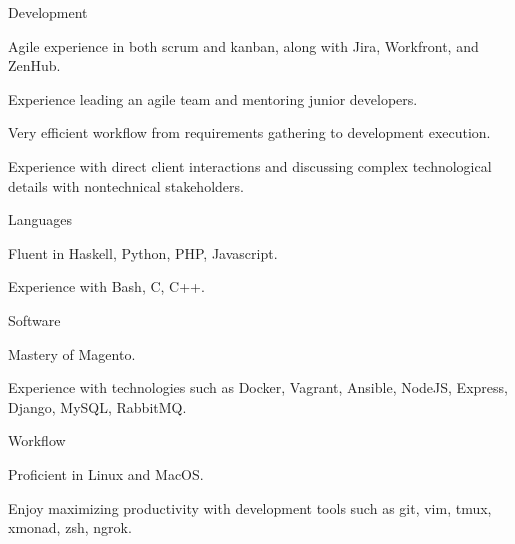 \begin{cvskills}
  \cvskill
    {Development}
    {\begin{cvitems}
        \item Agile experience in both scrum and kanban, along with Jira, Workfront, and ZenHub.
        \item Experience leading an agile team and mentoring junior developers.
        \item Very efficient workflow from requirements gathering to development execution.
        \item Experience with direct client interactions and
          discussing complex technological details with nontechnical stakeholders.
     \end{cvitems}}
  \cvskill
    {Languages}
    {\begin{cvitems}
        \item Fluent in Haskell, Python, PHP, Javascript.
        \item Experience with Bash, C, C++.
     \end{cvitems}}
  \cvskill
    {Software}
    {\begin{cvitems}
        \item Mastery of Magento.
        \item Experience with technologies such as Docker, Vagrant, Ansible, NodeJS, Express,
          Django, MySQL, RabbitMQ.
     \end{cvitems}}
  \cvskill
    {Workflow}
    {\begin{cvitems}
        \item Proficient in Linux and MacOS.
        \item Enjoy maximizing productivity with development tools such as
          git, vim, tmux, xmonad, zsh, ngrok.
     \end{cvitems}}
\end{cvskills}
